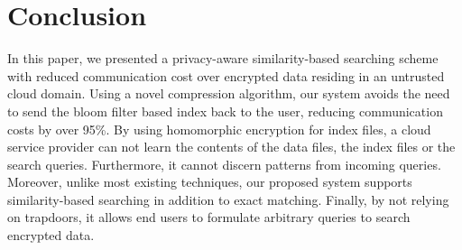 

\section{Conclusion}
\label{sec:conclusion}

In this paper, we presented a privacy-aware similarity-based searching scheme
with reduced communication cost over encrypted data residing in an untrusted
cloud domain. Using a novel compression 
algorithm, our system avoids the need to send the bloom filter based index back to the 
user, reducing communication costs by over 95\%.
By using homomorphic encryption for index files, a cloud service provider can not 
learn the contents of 
the data files, the index files or the search queries. Furthermore, it cannot 
discern patterns from incoming queries. Moreover, unlike most existing techniques, our
proposed system supports similarity-based searching in addition to exact matching.
Finally, by not relying on trapdoors, it allows end users to formulate
arbitrary queries to search encrypted data.

